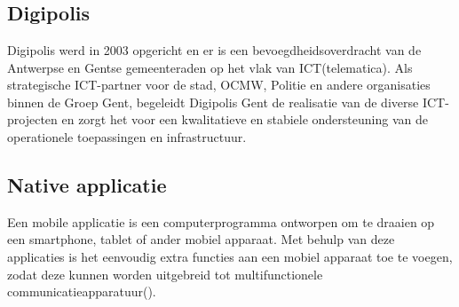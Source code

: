 
\chapter{}
\label{ch:inleiding}


\section{Digipolis}
\label{sec:digipolis}
Digipolis werd in 2003 opgericht en er is een bevoegdheidsoverdracht van de Antwerpse en Gentse gemeenteraden op het vlak van ICT(telematica). Als strategische ICT-partner voor de stad, OCMW, Politie en andere organisaties binnen de Groep Gent, begeleidt Digipolis Gent de realisatie van de diverse ICT-projecten en zorgt het voor een kwalitatieve en stabiele ondersteuning van de operationele toepassingen en infrastructuur.


\section{Native applicatie}
Een mobile applicatie is een computerprogramma ontworpen om te draaien op een smartphone, tablet of ander mobiel apparaat. Met behulp van deze applicaties is het eenvoudig extra functies aan een mobiel apparaat toe te voegen, zodat deze kunnen worden uitgebreid tot multifunctionele communicatieapparatuur(\cite{NATIVEAPP_DEFINITIE}).

